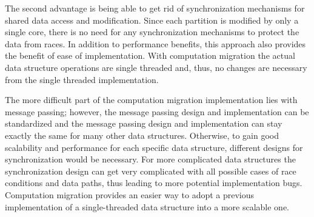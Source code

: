The second advantage is being able to get rid of synchronization mechanisms for shared data access and modification. 
Since each partition is modified by only a single core, there is no need for any synchronization mechanisms 
to protect the data from races. In addition to performance benefits, this approach also provides the benefit of ease of 
implementation. With computation migration the actual data structure operations are single threaded and, thus, no 
changes are necessary from the single threaded implementation. 

The more difficult part of the computation migration implementation lies with message passing; however, the message passing design 
and implementation can be standardized and the message passing design and implementation can stay exactly the same for many other data structures. 
Otherwise, to gain good scalability and performance for each specific data structure, different designs for synchronization would be 
necessary. For more complicated data structures the synchronization design can get very complicated with all 
possible cases of race conditions and data paths, thus leading to more potential implementation bugs. 
Computation migration provides an easier way to adopt a previous implementation of a single-threaded data structure 
into a more scalable one.


